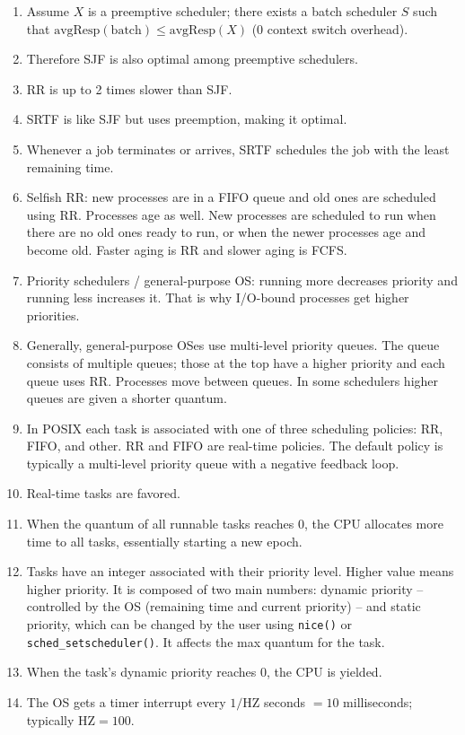 \documentclass[12pt,a4paper]{article}
\begin{document}
\begin{enumerate}
  \item Assume $X$ is a preemptive scheduler; there exists a batch scheduler $S$ such that $\text{avgResp}(\text{batch}) \leq \text{avgResp}(X)$ (0 context switch overhead).
  \item Therefore SJF is also optimal among preemptive schedulers.
  \item RR is up to 2 times slower than SJF.
  \item SRTF is like SJF but uses preemption, making it optimal.
  \item Whenever a job terminates or arrives, SRTF schedules the job with the least remaining time.
  \item Selfish RR: new processes are in a FIFO queue and old ones are scheduled using RR. Processes age as well. New processes are scheduled to run when there are no old ones ready to run, or when the newer processes age and become old. Faster aging is RR and slower aging is FCFS.
  \item Priority schedulers / general-purpose OS: running more decreases priority and running less increases it. That is why I/O-bound processes get higher priorities.
  \item Generally, general-purpose OSes use multi-level priority queues. The queue consists of multiple queues; those at the top have a higher priority and each queue uses RR. Processes move between queues. In some schedulers higher queues are given a shorter quantum.
  \item In POSIX each task is associated with one of three scheduling policies: RR, FIFO, and other. RR and FIFO are real-time policies. The default policy is typically a multi-level priority queue with a negative feedback loop.
  \item Real-time tasks are favored.
  \item When the quantum of all runnable tasks reaches 0, the CPU allocates more time to all tasks, essentially starting a new epoch.
  \item Tasks have an integer associated with their priority level. Higher value means higher priority. It is composed of two main numbers: dynamic priority -- controlled by the OS (remaining time and current priority) -- and static priority, which can be changed by the user using \texttt{nice()} or \texttt{sched\_setscheduler()}. It affects the max quantum for the task.
  \item When the task's dynamic priority reaches 0, the CPU is yielded.
  \item The OS gets a timer interrupt every $1/\text{HZ}$ seconds $= 10$ milliseconds; typically $\text{HZ} = 100$.

\end{enumerate}
\end{document}
